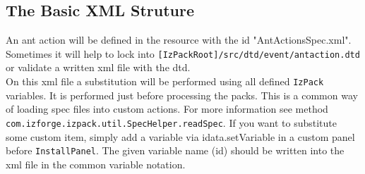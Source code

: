 \subsection{The Basic XML Struture}
An ant action will be defined in the resource with the id
"AntActionsSpec.xml". Sometimes it will help to lock into
\texttt{[IzPackRoot]/src/dtd/event/antaction.dtd} or validate a
written xml file with the dtd.\\
On this xml file a substitution will be performed using all
defined \texttt{IzPack} variables. It is performed just before
processing the packs. This is a common way of loading spec files
into custom actions. For more information see method
\texttt{com.izforge.izpack.util.SpecHelper.readSpec}.
If you want to substitute some custom item, simply add a variable
via idata.setVariable in a custom panel before \texttt{InstallPanel}.
The given variable name (id) should be written into the xml file
in the common variable notation.\\

